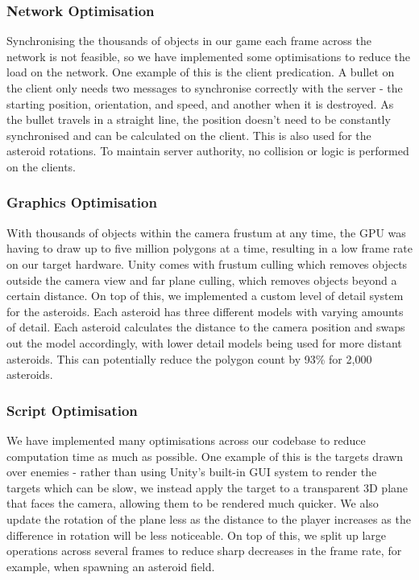 \documentclass[a4paper,11pt]{article}
\begin{document}
\subsubsection{Network Optimisation}
Synchronising the thousands of objects in our game each frame across the network is not feasible, so we have implemented some optimisations to reduce the load on the network. One example of this is the client predication. A bullet on the client only needs two messages to synchronise correctly with the server - the starting position, orientation, and speed, and another when it is destroyed. As the bullet travels in a straight line, the position doesn’t need to be constantly synchronised and can be calculated on the client. This is also used for the asteroid rotations. To maintain server authority, no collision or logic is performed on the clients.

\subsubsection{Graphics Optimisation}
With thousands of objects within the camera frustum at any time, the GPU was having to draw up to five million polygons at a time, resulting in a low frame rate on our target hardware. Unity comes with frustum culling which removes objects outside the camera view and far plane culling, which removes objects beyond a certain distance. On top of this, we implemented a custom level of detail system for the asteroids. Each asteroid has three different models with varying amounts of detail. Each asteroid calculates the distance to the camera position and swaps out the model accordingly, with lower detail models being used for more distant asteroids. This can potentially reduce the polygon count by 93\% for 2,000 asteroids.

\subsubsection{Script Optimisation}
We have implemented many optimisations across our codebase to reduce computation time as much as possible. One example of this is the targets drawn over enemies - rather than using Unity’s built-in GUI system to render the targets which can be slow, we instead apply the target to a transparent 3D plane that faces the camera, allowing them to be rendered much quicker. We also update the rotation of the plane less as the distance to the player increases as the difference in rotation will be less noticeable. On top of this, we split up large operations across several frames to reduce sharp decreases in the frame rate, for example, when spawning an asteroid field.
\end{document}
